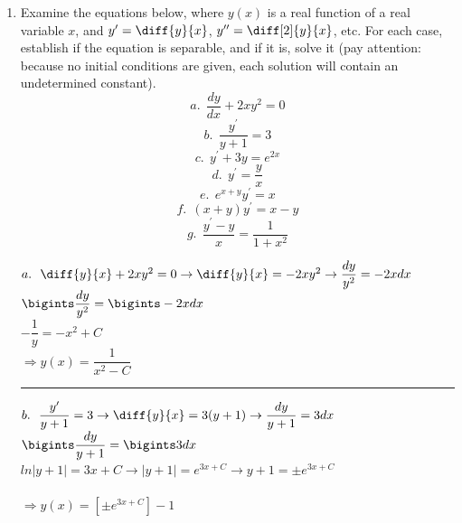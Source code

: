 \documentclass[fleqn]{article}
\begin{document}
  \begin{enumerate}
    \item  Examine the equations below, where $y(x)$ is a real function of a real variable $x$, and $y^\prime=\diff{y}{x}$,  $y^{\prime\prime}=\diff[2]{y}{x}$, etc. For each case, establish if the equation is separable, and if it is, solve it (pay attention: because no initial conditions are given, each solution will contain an undetermined constant). 
    \begin{equation*}
      a. ~~ \dfrac{dy}{dx}+2xy^2=0
    \end{equation*}
    \begin{equation*}
      b. ~~ \dfrac{y^{\prime}}{y+1}=3
    \end{equation*}
    \begin{equation*}
      c. ~~ y^{\prime}+3y=e^{2x}
    \end{equation*}
    \begin{equation*}
      d. ~~ y^{\prime}=\dfrac{y}{x}
    \end{equation*}
    \begin{equation*}
      e. ~~ e^{x+y}y^{\prime}=x
    \end{equation*}
    \begin{equation*}
      f. ~~ (x+y)y^{\prime}=x-y
    \end{equation*}
    \begin{equation*}
      g. ~~ \dfrac{y^{\prime}-y}{x}=\dfrac{1}{1+x^2}
    \end{equation*}

      \textcolor{hwColor}{ 
        $a. ~~ \diff{y}{x}+2xy^2=0 \rightarrow \diff{y}{x}=-2xy^2 \rightarrow \dfrac{dy}{y^2}=-2xdx$ \\
        $\bigints \dfrac{dy}{y^2}=\bigints -2xdx$ \\
        $-\dfrac{1}{y}=-x^2+C$ \\
        $\Longrightarrow y(x)=\dfrac{1}{x^2-C}$
      } 

      \textcolor{hwColor}{  
        \rule{15cm}{0.4pt}  
      }

      \textcolor{hwColor}{ 
        $b. ~~ \dfrac{y^{\prime}}{y+1}=3 \rightarrow \diff{y}{x}=3(y+1) \rightarrow \dfrac{dy}{y+1}=3dx$ \\
        $\bigints \dfrac{dy}{y+1}=\bigints 3dx$ \\
        $ln|y+1|=3x+C \rightarrow |y+1|=e^{3x+C} \rightarrow y+1=\pm e^{3x+C}$ \\
        \\
        $\Longrightarrow y(x)=\left[\pm e^{3x+C}\right]-1$
      }
      

\end{enumerate}
\end{document}
